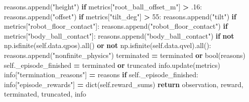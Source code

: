 \documentclass[
  american,
  11pt,
  letterpaper,
]{article}
\newenvironment{Shaded}{\begin{snugshade}}{\end{snugshade}}
\newcommand{\BuiltInTok}[1]{#1}
\newcommand{\ControlFlowTok}[1]{\textcolor[rgb]{0.13,0.29,0.53}{\textbf{#1}}}
\newcommand{\DecValTok}[1]{\textcolor[rgb]{0.00,0.00,0.81}{#1}}
\newcommand{\FloatTok}[1]{\textcolor[rgb]{0.00,0.00,0.81}{#1}}
\newcommand{\KeywordTok}[1]{\textcolor[rgb]{0.13,0.29,0.53}{\textbf{#1}}}
\newcommand{\NormalTok}[1]{#1}
\newcommand{\OperatorTok}[1]{\textcolor[rgb]{0.81,0.36,0.00}{\textbf{#1}}}
\newcommand{\StringTok}[1]{\textcolor[rgb]{0.31,0.60,0.02}{#1}}
\newcommand{\VariableTok}[1]{\textcolor[rgb]{0.00,0.00,0.00}{#1}}
\renewenvironment{Shaded}{\par\smallskip}{\par\smallskip}
\begin{document}
\begin{Shaded}
\begin{Highlighting}[]
\NormalTok{            reasons.append(}\StringTok{"height"}\NormalTok{)}
        \ControlFlowTok{if}\NormalTok{ metrics[}\StringTok{"root\_ball\_offset\_m"}\NormalTok{] }\OperatorTok{\textgreater{}} \FloatTok{.16}\NormalTok{:}
\NormalTok{            reasons.append(}\StringTok{"offset"}\NormalTok{)}
        \ControlFlowTok{if}\NormalTok{ metrics[}\StringTok{"tilt\_deg"}\NormalTok{] }\OperatorTok{\textgreater{}} \DecValTok{55}\NormalTok{:}
\NormalTok{            reasons.append(}\StringTok{"tilt"}\NormalTok{)}
        \ControlFlowTok{if}\NormalTok{ metrics[}\StringTok{"robot\_floor\_contact"}\NormalTok{]:}
\NormalTok{            reasons.append(}\StringTok{"robot\_floor\_contact"}\NormalTok{)}
        \ControlFlowTok{if}\NormalTok{ metrics[}\StringTok{"body\_ball\_contact"}\NormalTok{]:}
\NormalTok{            reasons.append(}\StringTok{"body\_ball\_contact"}\NormalTok{)}
        \ControlFlowTok{if} \KeywordTok{not}\NormalTok{ np.isfinite(}\VariableTok{self}\NormalTok{.data.qpos).}\BuiltInTok{all}\NormalTok{() }\KeywordTok{or} \KeywordTok{not}\NormalTok{ np.isfinite(}\VariableTok{self}\NormalTok{.data.qvel).}\BuiltInTok{all}\NormalTok{():}
\NormalTok{            reasons.append(}\StringTok{"nonfinite\_physics"}\NormalTok{)}
\NormalTok{        terminated }\OperatorTok{=}\NormalTok{ terminated }\KeywordTok{or} \BuiltInTok{bool}\NormalTok{(reasons)}
        \VariableTok{self}\NormalTok{.\_episode\_finished }\OperatorTok{=}\NormalTok{ terminated }\KeywordTok{or}\NormalTok{ truncated}
\NormalTok{        info.update(metrics)}
\NormalTok{        info[}\StringTok{"termination\_reasons"}\NormalTok{] }\OperatorTok{=}\NormalTok{ reasons}
        \ControlFlowTok{if} \VariableTok{self}\NormalTok{.\_episode\_finished:}
\NormalTok{            info[}\StringTok{"episode\_rewards"}\NormalTok{] }\OperatorTok{=} \BuiltInTok{dict}\NormalTok{(}\VariableTok{self}\NormalTok{.reward\_sums)}
        \ControlFlowTok{return}\NormalTok{ observation, reward, terminated, truncated, info}


\end{Highlighting}
\end{Shaded}
\end{document}
